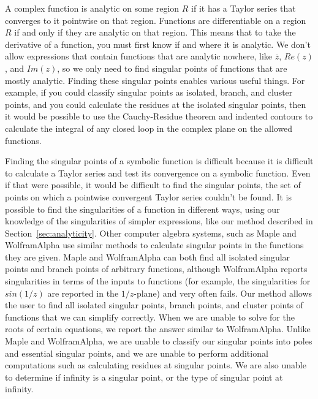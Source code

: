 A complex function is analytic on some region $R$ if it has a Taylor series that converges to it pointwise on that region. Functions are differentiable on a region $R$ if and only if they are analytic on that region. This means that to take the derivative of a function, you must first know if and where it is analytic. We don't allow expressions that contain functions that are analytic nowhere, like $\overline z$, $Re(z)$, and $Im(z)$, so we only need to find singular points of functions that are mostly analytic. Finding these singular points enables various useful things. For example, if you could classify singular points as isolated, branch, and cluster points, and you could calculate the residues at the isolated singular points, then it would be possible to use the Cauchy-Residue theorem and indented contours to calculate the integral of any closed loop in the complex plane on the allowed functions.

Finding the singular points of a symbolic function is difficult because it is difficult to calculate a Taylor series and test its convergence on a symbolic function. Even if that were possible, it would be difficult to find the singular points, the set of points on which a pointwise convergent Taylor series couldn't be found. It is possible to find the singularities of a function in different ways, using our knowledge of the singularities of simpler expressions, like our method described in Section~\ref{sec:analyticity}. Other computer algebra systems, such as Maple and WolframAlpha use similar methods to calculate singular points in the functions they are given. Maple and WolframAlpha can both find all isolated singular points and branch points of arbitrary functions, although WolframAlpha reports singularities in terms of the inputs to functions (for example, the singularities for $sin(1/z)$ are reported in the $1/z$-plane) and very often fails. Our method allows the user to find all isolated singular points, branch points, and cluster points of functions that we can simplify correctly. When we are unable to solve for the roots of certain equations, we report the answer similar to WolframAlpha. Unlike Maple and WolframAlpha, we are unable to classify our singular points into poles and essential singular points, and we are unable to perform additional computations such as calculating residues at singular points. We are also unable to determine if infinity is a singular point, or the type of singular point at infinity.
